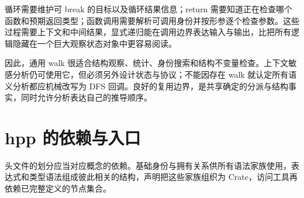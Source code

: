 循环需要维护可 break 的目标以及循环结果信息；return 需要知道正在检查哪个函数和预期返回类型；函数调用需要解析可调用身份并按形参逐个检查参数。这些过程需要上下文和中间结果，显式递归能在调用边界表达输入与输出，比把所有逻辑隐藏在一个巨大观察状态对象中更容易阅读。

因此，通用 walk 很适合结构观察、统计、身份搜索和结构不变量检查。上下文敏感分析仍可使用它，但必须另外设计状态与协议；不能因存在 walk 就认定所有语义分析都应机械改写为 DFS 回调。良好的复用边界，是共享确定的分派与结构事实，同时允许分析表达自己的推导顺序。

\section{hpp 的依赖与入口}
头文件的划分应当对应概念的依赖。基础身份与拥有关系供所有语法家族使用，表达式和类型语法组成彼此相关的结构，声明把这些家族组织为 Crate，访问工具再依赖已完整定义的节点集合。

